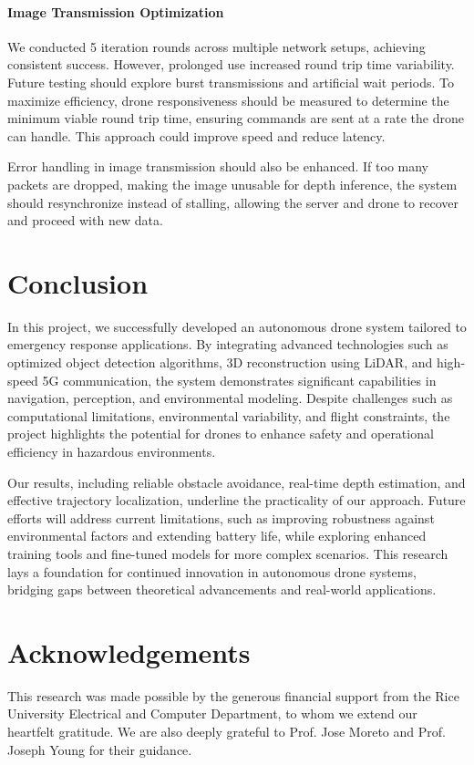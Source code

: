 \documentclass[conference]{IEEEtran}
\begin{document}
\paragraph{Image Transmission Optimization}
We conducted 5 iteration rounds across multiple network setups, achieving consistent success. However, prolonged use increased round trip time variability. Future testing should explore burst transmissions and artificial wait periods. To maximize efficiency, drone responsiveness should be measured to determine the minimum viable round trip time, ensuring commands are sent at a rate the drone can handle. This approach could improve speed and reduce latency.

Error handling in image transmission should also be enhanced. If too many packets are dropped, making the image unusable for depth inference, the system should resynchronize instead of stalling, allowing the server and drone to recover and proceed with new data.

\section{Conclusion}
In this project, we successfully developed an autonomous drone system tailored to emergency response applications. By integrating advanced technologies such as optimized object detection algorithms, 3D reconstruction using LiDAR, and high-speed 5G communication, the system demonstrates significant capabilities in navigation, perception, and environmental modeling. Despite challenges such as computational limitations, environmental variability, and flight constraints, the project highlights the potential for drones to enhance safety and operational efficiency in hazardous environments.

Our results, including reliable obstacle avoidance, real-time depth estimation, and effective trajectory localization, underline the practicality of our approach. Future efforts will address current limitations, such as improving robustness against environmental factors and extending battery life, while exploring enhanced training tools and fine-tuned models for more complex scenarios. This research lays a foundation for continued innovation in autonomous drone systems, bridging gaps between theoretical advancements and real-world applications.

\section*{Acknowledgements}
This research was made possible by the generous financial support from the Rice University Electrical and Computer Department, to whom we extend our heartfelt gratitude. We are also deeply grateful to Prof. Jose Moreto and Prof. Joseph Young for their guidance.
\end{document}
